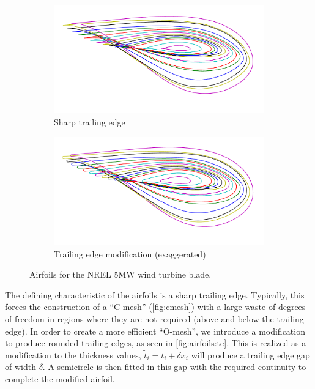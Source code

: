 \documentclass[3p,times,procedia]{elsarticle}
\begin{document}
\begin{figure}
  \centering
  \begin{subfigure}[b]{0.45\textwidth}
    \includegraphics[width=\textwidth]{figs/airfoils-note}
    \caption{Sharp trailing edge}
    \label{fig:airfoils:note}
  \end{subfigure}
  \begin{subfigure}[b]{0.45\textwidth}
    \includegraphics[width=\textwidth]{figs/airfoils-te}
    \caption{Trailing edge modification (exaggerated)}
    \label{fig:airfoils:te}
  \end{subfigure}
  \caption{Airfoils for the NREL 5MW wind turbine blade.}
\end{figure}

The defining characteristic of the airfoils is a sharp trailing edge. Typically,
this forces the construction of a ``C-mesh'' (\autoref{fig:cmesh}) with a large
waste of degrees of freedom in regions where they are not required (above and
below the trailing edge). In order to create a more efficient ``O-mesh'', we
introduce a modification to produce rounded trailing edges, as seen in
\autoref{fig:airfoils:te}. This is realized as a modification to the thickness
values, $\tilde{t}_i = t_i + \delta x_i$ will produce a trailing edge gap of
width $\delta$. A semicircle is then fitted in this gap with the required
continuity to complete the modified airfoil.
\end{document}
